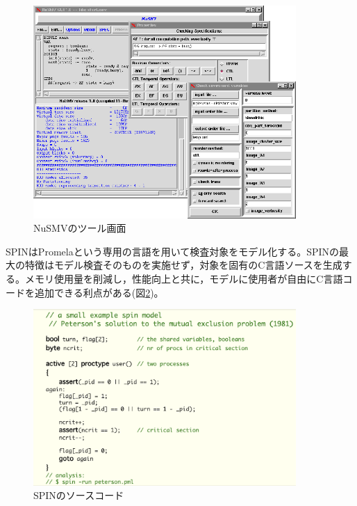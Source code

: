 \documentclass{tpu-sotu}
\begin{document}
	\begin{figure}[htbp]
	\centering
	\includegraphics[width=100mm]{NuSMV.png}
	\caption{NuSMVのツール画面\cite{n2}}
	\label{NuSMV}
	\end{figure}
	
	SPINはPromelaという専用の言語を用いて検査対象をモデル化する。SPINの最大の特徴はモデル検査そのものを実施せず，対象を固有のC言語ソースを生成する。メモリ使用量を削減し，性能向上と共に，モデルに使用者が自由にC言語コードを追加できる利点がある(図\ref{SPIN})。
		
	\begin{figure}[htbp]
	\centering
	\includegraphics[width=100mm]{SPIN.png}
	\caption{SPINのソースコード\cite{s2}}
	\label{SPIN}
	\end{figure}
	
\end{document}
